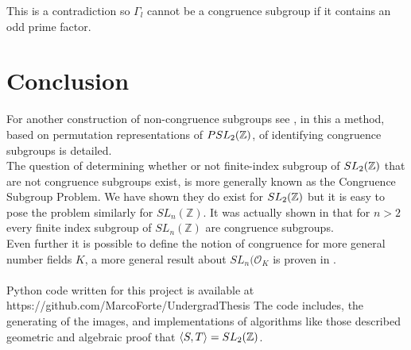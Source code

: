\begin{example}
This is a contradiction so $\Gamma_l$ cannot be a congruence subgroup if it contains an odd prime factor.
\end{example}

\section{Conclusion}
For another construction of non-congruence subgroups see \citep{hsu1996identifying}, in this a method, based on permutation representations of $PSL_2(\mathbb{Z})$, of identifying congruence subgroups is detailed.\\
The question of determining whether or not finite-index subgroup of $SL_2(\mathbb{Z})$ that are not congruence subgroups exist, is more generally known as the Congruence Subgroup Problem. We have shown they do exist for $SL_2(\mathbb{Z})$ but it is easy to pose the problem similarly for $SL_n(\mathbb{Z})$. It was actually shown in \citep{bass1964} that for $n > 2$ every finite index subgroup of $SL_n(\mathbb{Z})$ are congruence subgroups. \\
Even further it is possible to define the notion of congruence for more general number fields $K$, a more general result about $SL_n(\mathcal{O}_K$ is proven in \citep{bassSolution}.\\
\\
Python code written for this project is available at https://github.com/MarcoForte/UndergradThesis
The code includes, the generating of the images, and implementations of algorithms like those described geometric and algebraic proof that $\langle S, T \rangle = SL_2(\mathbb{Z})$.